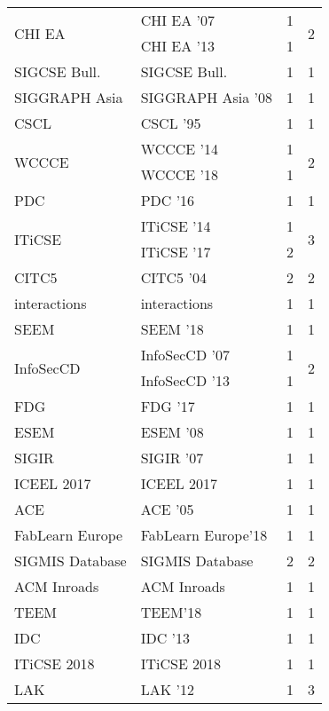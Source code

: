 \begin{table*}[t]
\begin{tabular}{llrr}
\multirow{2}{*}{CHI EA } & CHI EA '07 & 1 & \multirow{2}{*}{2}\\
& CHI EA '13 & 1 &\\
\multirow{1}{*}{SIGCSE Bull.} & SIGCSE Bull. & 1 & \multirow{1}{*}{1}\\
\multirow{1}{*}{SIGGRAPH Asia } & SIGGRAPH Asia '08 & 1 & \multirow{1}{*}{1}\\
\multirow{1}{*}{CSCL } & CSCL '95 & 1 & \multirow{1}{*}{1}\\
\multirow{2}{*}{WCCCE } & WCCCE '14 & 1 & \multirow{2}{*}{2}\\
& WCCCE '18 & 1 &\\
\multirow{1}{*}{PDC } & PDC '16 & 1 & \multirow{1}{*}{1}\\
\multirow{2}{*}{ITiCSE } & ITiCSE '14 & 1 & \multirow{2}{*}{3}\\
& ITiCSE '17 & 2 &\\
\multirow{1}{*}{CITC5 } & CITC5 '04 & 2 & \multirow{1}{*}{2}\\
\multirow{1}{*}{interactions} & interactions & 1 & \multirow{1}{*}{1}\\
\multirow{1}{*}{SEEM } & SEEM '18 & 1 & \multirow{1}{*}{1}\\
\multirow{2}{*}{InfoSecCD } & InfoSecCD '07 & 1 & \multirow{2}{*}{2}\\
& InfoSecCD '13 & 1 &\\
\multirow{1}{*}{FDG } & FDG '17 & 1 & \multirow{1}{*}{1}\\
\multirow{1}{*}{ESEM } & ESEM '08 & 1 & \multirow{1}{*}{1}\\
\multirow{1}{*}{SIGIR } & SIGIR '07 & 1 & \multirow{1}{*}{1}\\
\multirow{1}{*}{ICEEL 2017} & ICEEL 2017 & 1 & \multirow{1}{*}{1}\\
\multirow{1}{*}{ACE } & ACE '05 & 1 & \multirow{1}{*}{1}\\
\multirow{1}{*}{FabLearn Europe} & FabLearn Europe'18 & 1 & \multirow{1}{*}{1}\\
\multirow{1}{*}{SIGMIS Database} & SIGMIS Database & 2 & \multirow{1}{*}{2}\\
\multirow{1}{*}{ACM Inroads} & ACM Inroads & 1 & \multirow{1}{*}{1}\\
\multirow{1}{*}{TEEM} & TEEM'18 & 1 & \multirow{1}{*}{1}\\
\multirow{1}{*}{IDC } & IDC '13 & 1 & \multirow{1}{*}{1}\\
\multirow{1}{*}{ITiCSE 2018} & ITiCSE 2018 & 1 & \multirow{1}{*}{1}\\
\multirow{2}{*}{LAK } & LAK '12 & 1 & \multirow{2}{*}{3}\\

\end{tabular}
\end{table*}
